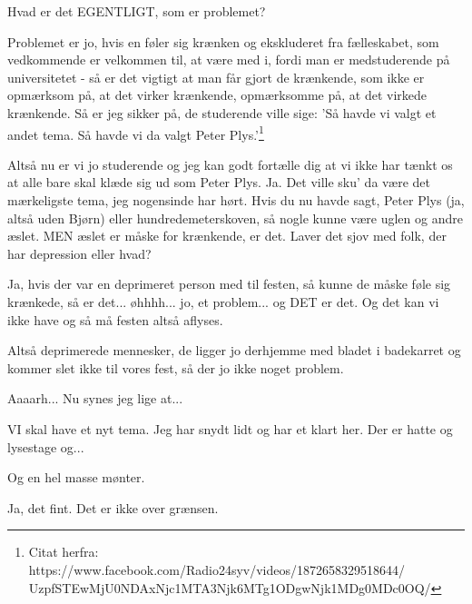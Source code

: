 \documentclass[a4paper,11pt]{article}
\begin{document}
\begin{sketch}
 Hvad er det EGENTLIGT, som er problemet?

 Problemet er jo, hvis en føler sig krænken og ekskluderet fra fælleskabet, som vedkommende er velkommen til, at være med i, fordi man er medstuderende på universitetet - så er det vigtigt at man får gjort de krænkende, som ikke er opmærksom på, at det virker krænkende, opmærksomme på, at det virkede krænkende. Så er jeg sikker på, de studerende ville sige: 'Så havde vi valgt et andet tema. Så havde vi da valgt Peter Plys.'\footnote{Citat herfra: https://www.facebook.com/Radio24syv/videos/1872658329518644/ \\ UzpfSTEwMjU0NDAxNjc1MTA3Njk6MTg1ODgwNjk1MDg0MDc0OQ/}

 Altså nu er vi jo studerende og jeg kan godt fortælle dig at vi ikke har tænkt os at alle bare skal klæde sig ud som Peter Plys.
Ja. Det ville sku' da være det mærkeligste tema, jeg nogensinde har hørt. Hvis du nu havde sagt, Peter Plys (ja, altså uden Bjørn) eller hundredemeterskoven, så nogle kunne være uglen og andre æslet. MEN æslet er måske for krænkende, er det. Laver det sjov med folk, der har depression eller hvad?

 Ja, hvis der var en deprimeret person med til festen, så kunne de måske føle sig krænkede, så er det... øhhhh... jo, et problem... og DET er det. Og det kan vi ikke have og så må festen altså aflyses.

 Altså deprimerede mennesker, de ligger jo derhjemme med bladet i badekarret og kommer slet ikke til vores fest, så der jo ikke noget problem.

 Aaaarh... Nu synes jeg lige at...

 VI skal have et nyt tema. Jeg har snydt lidt og har et klart her. Der er hatte og lysestage og...


 Og en hel masse mønter.

 Ja, det fint. Det er ikke over grænsen.

\end{sketch}
\end{document}
